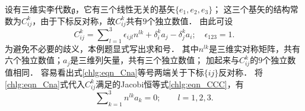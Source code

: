 设有三维实李代数$\mathfrak{g}$，它有三个线性无关的基矢$\{e_1,e_2,e_3\}$；
这三个基矢的结构常数为$C^k_{ij}$，由于下标反对称，故$C^k_{ij}$共有$9$个独立数值．
由此可设
\begin{equation}\label{chlg:eqn_Cna}
	C^k_{ij} = \sum\nolimits_{l=1}^{3}\epsilon_{ijl} n^{lk} + \delta^k_i a_j - \delta^k_j a_i ; 
	\quad \epsilon_{123} =1.	
\end{equation}
为避免不必要的歧义，本例题显式写出求和号．
其中$n^{lk}$是三维实对称矩阵，共有六个独立数值；$a_j$是三维列矢量，共有三个独立数值；
加起来与$C^k_{ij}$的$9$个独立数值相同．
容易看出式\eqref{chlg:eqn_Cna}等号两端关于下标$\{ij\}$反对称．
将\eqref{chlg:eqn_Cna}式代入$C^k_{ij}$满足的Jacobi恒等式\eqref{chlg:eqn_CCC}，有
\begin{equation}\label{chlg:eqn_Jacobi-na}
	\sum\nolimits_{k=1}^{3}n^{lk} a_k =0;\qquad l=1,2,3.
\end{equation}
